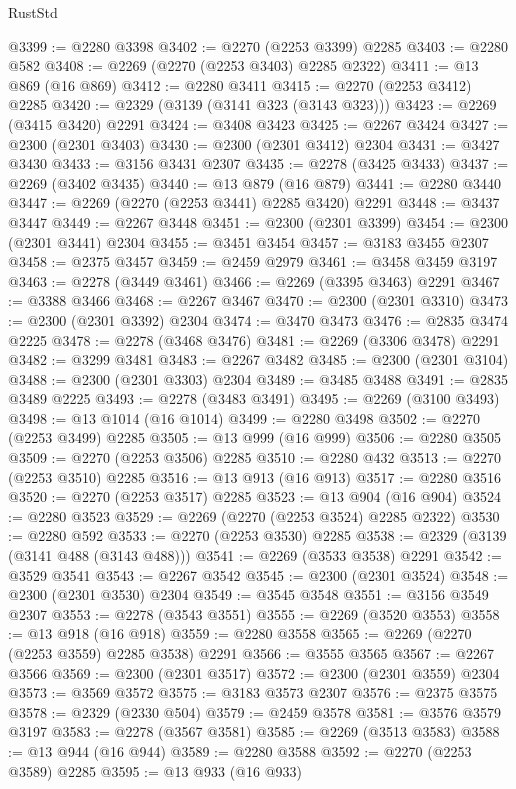 \begin{lexlean}{RustStd}
\begin{coremodule}
@3399 := @2280 @3398
@3402 := @2270 (@2253 @3399) @2285
@3403 := @2280 @582
@3408 := @2269 (@2270 (@2253 @3403) @2285 @2322)
@3411 := @13 @869 (@16 @869)
@3412 := @2280 @3411
@3415 := @2270 (@2253 @3412) @2285
@3420 := @2329 (@3139 (@3141 @323 (@3143 @323)))
@3423 := @2269 (@3415 @3420) @2291
@3424 := @3408 @3423
@3425 := @2267 @3424
@3427 := @2300 (@2301 @3403)
@3430 := @2300 (@2301 @3412) @2304
@3431 := @3427 @3430
@3433 := @3156 @3431 @2307
@3435 := @2278 (@3425 @3433)
@3437 := @2269 (@3402 @3435)
@3440 := @13 @879 (@16 @879)
@3441 := @2280 @3440
@3447 := @2269 (@2270 (@2253 @3441) @2285 @3420) @2291
@3448 := @3437 @3447
@3449 := @2267 @3448
@3451 := @2300 (@2301 @3399)
@3454 := @2300 (@2301 @3441) @2304
@3455 := @3451 @3454
@3457 := @3183 @3455 @2307
@3458 := @2375 @3457
@3459 := @2459 @2979
@3461 := @3458 @3459 @3197
@3463 := @2278 (@3449 @3461)
@3466 := @2269 (@3395 @3463) @2291
@3467 := @3388 @3466
@3468 := @2267 @3467
@3470 := @2300 (@2301 @3310)
@3473 := @2300 (@2301 @3392) @2304
@3474 := @3470 @3473
@3476 := @2835 @3474 @2225
@3478 := @2278 (@3468 @3476)
@3481 := @2269 (@3306 @3478) @2291
@3482 := @3299 @3481
@3483 := @2267 @3482
@3485 := @2300 (@2301 @3104)
@3488 := @2300 (@2301 @3303) @2304
@3489 := @3485 @3488
@3491 := @2835 @3489 @2225
@3493 := @2278 (@3483 @3491)
@3495 := @2269 (@3100 @3493)
@3498 := @13 @1014 (@16 @1014)
@3499 := @2280 @3498
@3502 := @2270 (@2253 @3499) @2285
@3505 := @13 @999 (@16 @999)
@3506 := @2280 @3505
@3509 := @2270 (@2253 @3506) @2285
@3510 := @2280 @432
@3513 := @2270 (@2253 @3510) @2285
@3516 := @13 @913 (@16 @913)
@3517 := @2280 @3516
@3520 := @2270 (@2253 @3517) @2285
@3523 := @13 @904 (@16 @904)
@3524 := @2280 @3523
@3529 := @2269 (@2270 (@2253 @3524) @2285 @2322)
@3530 := @2280 @592
@3533 := @2270 (@2253 @3530) @2285
@3538 := @2329 (@3139 (@3141 @488 (@3143 @488)))
@3541 := @2269 (@3533 @3538) @2291
@3542 := @3529 @3541
@3543 := @2267 @3542
@3545 := @2300 (@2301 @3524)
@3548 := @2300 (@2301 @3530) @2304
@3549 := @3545 @3548
@3551 := @3156 @3549 @2307
@3553 := @2278 (@3543 @3551)
@3555 := @2269 (@3520 @3553)
@3558 := @13 @918 (@16 @918)
@3559 := @2280 @3558
@3565 := @2269 (@2270 (@2253 @3559) @2285 @3538) @2291
@3566 := @3555 @3565
@3567 := @2267 @3566
@3569 := @2300 (@2301 @3517)
@3572 := @2300 (@2301 @3559) @2304
@3573 := @3569 @3572
@3575 := @3183 @3573 @2307
@3576 := @2375 @3575
@3578 := @2329 (@2330 @504)
@3579 := @2459 @3578
@3581 := @3576 @3579 @3197
@3583 := @2278 (@3567 @3581)
@3585 := @2269 (@3513 @3583)
@3588 := @13 @944 (@16 @944)
@3589 := @2280 @3588
@3592 := @2270 (@2253 @3589) @2285
@3595 := @13 @933 (@16 @933)

\end{coremodule}
\end{lexlean}
